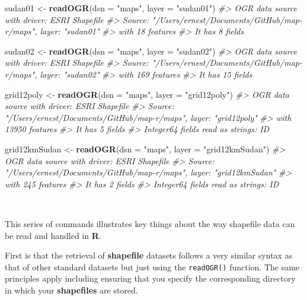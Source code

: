 \documentclass[12pt,a4paper,a4paper]{book}
\newenvironment{Shaded}{\begin{snugshade}}{\end{snugshade}}
\newcommand{\KeywordTok}[1]{\textcolor[rgb]{0.13,0.29,0.53}{\textbf{#1}}}
\newcommand{\DataTypeTok}[1]{\textcolor[rgb]{0.13,0.29,0.53}{#1}}
\newcommand{\StringTok}[1]{\textcolor[rgb]{0.31,0.60,0.02}{#1}}
\newcommand{\CommentTok}[1]{\textcolor[rgb]{0.56,0.35,0.01}{\textit{#1}}}
\newcommand{\NormalTok}[1]{#1}
\theoremstyle{definition}
\theoremstyle{definition}
\theoremstyle{definition}
\theoremstyle{remark}
\begin{document}
\begin{Shaded}
\begin{Highlighting}[]
\NormalTok{sudan01 <-}\StringTok{ }\KeywordTok{readOGR}\NormalTok{(}\DataTypeTok{dsn =} \StringTok{"maps"}\NormalTok{, }\DataTypeTok{layer =} \StringTok{"sudan01"}\NormalTok{)}
\CommentTok{#> OGR data source with driver: ESRI Shapefile }
\CommentTok{#> Source: "/Users/ernest/Documents/GitHub/map-r/maps", layer: "sudan01"}
\CommentTok{#> with 18 features}
\CommentTok{#> It has 8 fields}

\NormalTok{sudan02 <-}\StringTok{ }\KeywordTok{readOGR}\NormalTok{(}\DataTypeTok{dsn =} \StringTok{"maps"}\NormalTok{, }\DataTypeTok{layer =} \StringTok{"sudan02"}\NormalTok{)}
\CommentTok{#> OGR data source with driver: ESRI Shapefile }
\CommentTok{#> Source: "/Users/ernest/Documents/GitHub/map-r/maps", layer: "sudan02"}
\CommentTok{#> with 169 features}
\CommentTok{#> It has 15 fields}

\NormalTok{grid12poly <-}\StringTok{ }\KeywordTok{readOGR}\NormalTok{(}\DataTypeTok{dsn =} \StringTok{"maps"}\NormalTok{, }\DataTypeTok{layer =} \StringTok{"grid12poly"}\NormalTok{)}
\CommentTok{#> OGR data source with driver: ESRI Shapefile }
\CommentTok{#> Source: "/Users/ernest/Documents/GitHub/map-r/maps", layer: "grid12poly"}
\CommentTok{#> with 13950 features}
\CommentTok{#> It has 5 fields}
\CommentTok{#> Integer64 fields read as strings:  ID}

\NormalTok{grid12kmSudan <-}\StringTok{ }\KeywordTok{readOGR}\NormalTok{(}\DataTypeTok{dsn =} \StringTok{"maps"}\NormalTok{, }\DataTypeTok{layer =} \StringTok{"grid12kmSudan"}\NormalTok{)}
\CommentTok{#> OGR data source with driver: ESRI Shapefile }
\CommentTok{#> Source: "/Users/ernest/Documents/GitHub/map-r/maps", layer: "grid12kmSudan"}
\CommentTok{#> with 245 features}
\CommentTok{#> It has 2 fields}
\CommentTok{#> Integer64 fields read as strings:  ID}
\end{Highlighting}
\end{Shaded}

~

This series of commands illustrates key things about the way shapefile
data can be read and handled in \textbf{R}.

First is that the retrieval of \textbf{shapefile} datasets follows a
very similar syntax as that of other standard datasets but just using
the \texttt{readOGR()} function. The same principles apply including
ensuring that you specify the corresponding directory in which your
\textbf{shapefiles} are stored.
\end{document}
